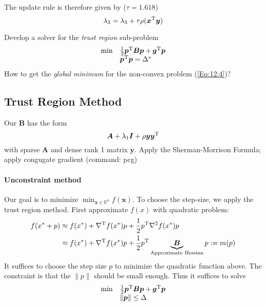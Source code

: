 The update rule is therefore given by ($\tau=1.618$)
\[
\lambda_3=\lambda_3+\tau\rho(\bm x^{\mathrm T}\bm y)
\]

Develop a solver for the \emph{trust region} sub-problem
\begin{equation}\label{Eq:12:4}
\begin{array}{ll}
\min&\frac{1}{2}\bm p\trans\bm B\bm p+\bm g\trans\bm p\\
&
\bm p\trans\bm p=\Delta^*
\end{array}
\end{equation}
How to get the \emph{global minimum} for the non-convex problem (\ref{Eq:12:4})?


\subsection{Trust Region Method}
Our $\bm B$ has the form
\[
\bm A+\lambda_1\bm I+\rho\bm y\bm y^{\mathrm T}
\]
with sparse $\bm A$ and dense rank 1 matrix $\bm y$. Apply the Sherman-Morrison Formula; apply congugate gradient (command: pcg)

\paragraph{Unconstraint method}
Our goal is to minimize $\min_{\bm x\in\mathbb{R}^n}f(\bm x)$. To choose the step-size, we apply the trust region method. First approximate $f(x)$ with quadratic problem:
\begin{align*}
f(x^*+p)&\approx
f(x^*)+\nabla^{\mathrm T} f(x^*)p+\frac{1}{2}p^{\mathrm T}\nabla^2f(x^*)p\\
&\approx
f(x^*)+\nabla^{\mathrm T} f(x^*)p+\frac{1}{2}p^{\mathrm T}\underbrace{\bm B}_{\text{Approximate Hessian}}p:=m(p)
\end{align*}
It suffices to choose the step size $p$ to minimize the quadratic function above. The constraint is that the $\|p\|$ should be small enough. Thus it suffices to solve
\begin{equation}
\begin{array}{ll}
\min&\frac{1}{2}\bm p^{\mathrm T}\bm B\bm p+\bm g^{\mathrm T}\bm p\\
&\|\bm p\|\le\Delta
\end{array}
\end{equation}



